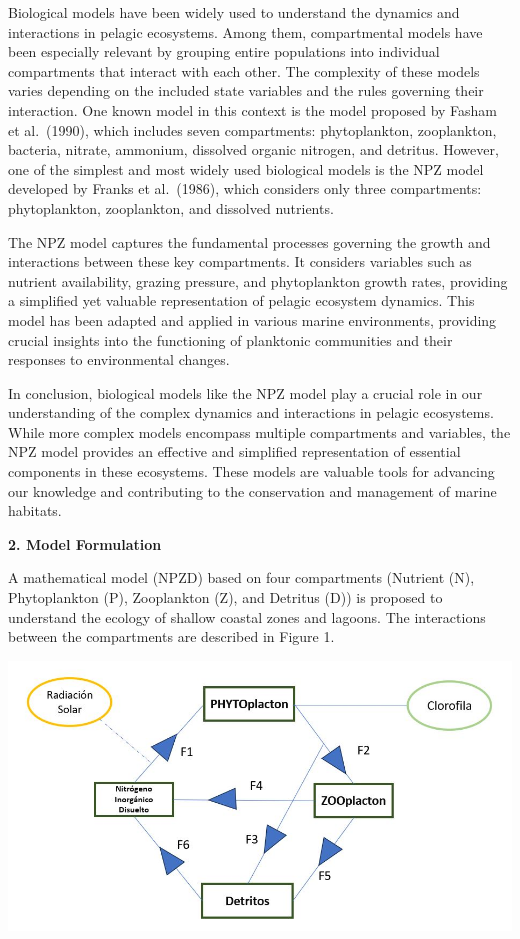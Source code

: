 \documentclass[
  letterpaper,
  DIV=11,
  numbers=noendperiod]{scrartcl}
\begin{document}
Biological models have been widely used to understand the dynamics and
interactions in pelagic ecosystems. Among them, compartmental models
have been especially relevant by grouping entire populations into
individual compartments that interact with each other. The complexity of
these models varies depending on the included state variables and the
rules governing their interaction. One known model in this context is
the model proposed by Fasham et al.~(1990), which includes seven
compartments: phytoplankton, zooplankton, bacteria, nitrate, ammonium,
dissolved organic nitrogen, and detritus. However, one of the simplest
and most widely used biological models is the NPZ model developed by
Franks et al.~(1986), which considers only three compartments:
phytoplankton, zooplankton, and dissolved nutrients.

The NPZ model captures the fundamental processes governing the growth
and interactions between these key compartments. It considers variables
such as nutrient availability, grazing pressure, and phytoplankton
growth rates, providing a simplified yet valuable representation of
pelagic ecosystem dynamics. This model has been adapted and applied in
various marine environments, providing crucial insights into the
functioning of planktonic communities and their responses to
environmental changes.

In conclusion, biological models like the NPZ model play a crucial role
in our understanding of the complex dynamics and interactions in pelagic
ecosystems. While more complex models encompass multiple compartments
and variables, the NPZ model provides an effective and simplified
representation of essential components in these ecosystems. These models
are valuable tools for advancing our knowledge and contributing to the
conservation and management of marine habitats.

\textbf{2. Model Formulation}

A mathematical model (NPZD) based on four compartments (Nutrient (N),
Phytoplankton (P), Zooplankton (Z), and Detritus (D)) is proposed to
understand the ecology of shallow coastal zones and lagoons. The
interactions between the compartments are described in Figure 1.

\includegraphics{NPZD.JPG}
\end{document}

